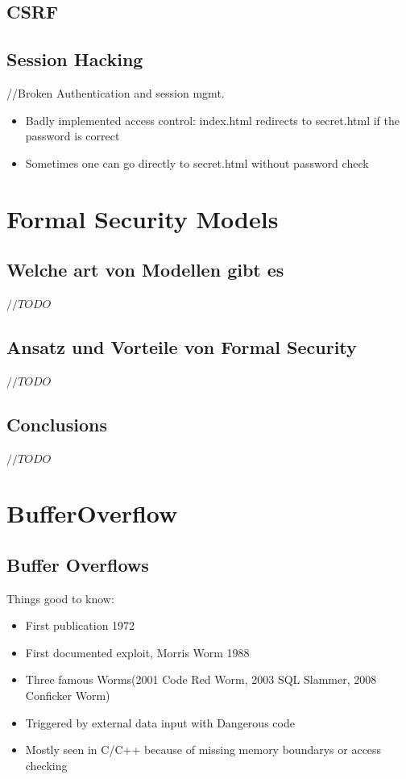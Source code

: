 \documentclass[a4paper, 12pt]{article}
\begin{document}
\subsection{CSRF}
\subsection{Session Hacking}
//Broken Authentication and session mgmt.
\begin{itemize}
\item Badly implemented access control: index.html redirects to secret.html if the password is correct
\item Sometimes one can go directly to secret.html without password check
\end{itemize}

\section{Formal Security Models}
\subsection{Welche art von Modellen gibt es}
$ //TODO $
\subsection{Ansatz und Vorteile von Formal Security}
$ //TODO $
\subsection{Conclusions}
$ //TODO $

\section{BufferOverflow}
\subsection{Buffer Overflows}
Things good to know:
\begin{itemize}
\item First publication 1972
\item First documented exploit, Morris Worm 1988
\item Three famous Worms(2001 Code Red Worm, 2003 SQL Slammer, 2008 Conficker Worm)
\item Triggered by external data input with Dangerous code
\item Mostly seen in C/C++ because of missing memory boundarys or access checking
\end{itemize}
\end{document}
